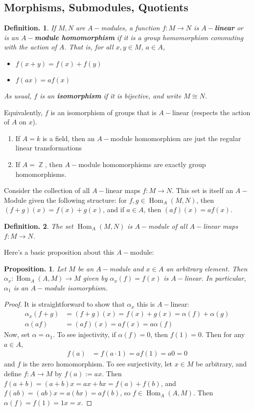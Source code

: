\documentclass[11pt, a4paper]{memoir}
\DeclareMathOperator{\Z}{{\mathbb{Z}}}
\theoremstyle{change}
\newtheorem{proposition}[theorem]{Proposition.}
\theoremstyle{plain}
\theoremstyle{nonumberplain}
\newtheorem{definition}{Definition.}
\newtheorem{proof}{Proof}
\DeclareMathOperator{\Hom}{Hom}
\numberwithin{equation}{section}
\begin{document}
\subsection{Morphisms, Submodules, Quotients}
\begin{definition}
    If $M,N$ are $A-$modules, a function $f:M\to N$ is \textbf{$A-$linear} or is an \textbf{$A-$module homomorphism} if it is a group homomorphism commuting with the action of $A$.
    That is, for all $x,y\in M$, $a\in A$,
    \begin{itemize}[nolistsep]
        \item $f(x+y)=f(x)+f(y)$
        \item $f(ax)=af(x)$
    \end{itemize}
    As usual, $f$ is an \textbf{isomorphism} if it is bijective, and write $M\cong N$.
\end{definition}
Equivalently, $f$ is an isomorphism of groups that is $A-$linear (respects the action of $A$ on $x$).
\begin{enumerate}[nolistsep]
    \item If $A=k$ is a field, then an $A-$module homomorphism are just the regular linear transformations
    \item If $A=\Z$, then $A-$module homomorphisms are exactly group homomorphisms.
\end{enumerate}
Consider the collection of all $A-$linear maps $f:M\to N$.
This set is itself an $A-$Module given the following structure: for $f,g\in \Hom_A(M,N)$, then $(f+g)(x)=f(x)+g(x)$, and if $a\in A$, then $(af)(x)=af(x)$.
\begin{definition}
    The set $\Hom_A(M,N)$ is $A-$module of all $A-$linear maps $f:M\to N$.
\end{definition}
Here's a basic proposition about this $A-$module:
\begin{proposition}
    Let $M$ be an $A-$module and $x\in A$ an arbitrary element.
    Then $\alpha_x:\Hom_A(A,M)\to M$ given by $\alpha_x(f)=f(x)$ is $A-$linear.
    In particular, $\alpha_1$ is an $A-$module isomorphism.
\end{proposition}
\begin{proof}
    It is straightforward to show that $\alpha_x$ this is $A-$linear:
    \begin{align*}
        \alpha_x(f+g)&=(f+g)(x)=f(x)+g(x)=\alpha(f)+\alpha(g)\\
        \alpha(af) &= (af)(x)=af(x)=a\alpha(f)
    \end{align*}
    Now, set $\alpha=\alpha_1$.
    To see injectivity, if $\alpha(f)=0$, then $f(1)=0$.
    Then for any $a\in A$,
    \begin{align*}
        f(a) &= f(a\cdot 1)=af(1)=a0=0
    \end{align*}
    and $f$ is the zero homomorphism.
    To see surjectivity, let $x\in M$ be arbitrary, and define $f:A\to M$ by $f(a):= ax$.
    Then $f(a+b)=(a+b)x=ax+bx=f(a)+f(b)$, and $f(ab)=(ab)x=a(bx)=af(b)$, so $f\in\Hom_A(A,M)$.
    Then $\alpha(f)=f(1)=1x=x$.
\end{proof}
\end{document}
